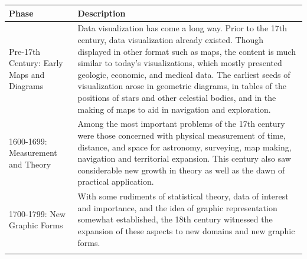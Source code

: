 \documentclass[]{book}
\theoremstyle{definition}
\theoremstyle{definition}
\theoremstyle{definition}
\theoremstyle{remark}
\begin{document}
\begin{longtable}[]{@{}ll@{}}
\toprule
\begin{minipage}[b]{0.16\columnwidth}\raggedright\strut
\textbf{Phase}\strut
\end{minipage} & \begin{minipage}[b]{0.78\columnwidth}\raggedright\strut
\textbf{Description}\strut
\end{minipage}\tabularnewline
\midrule
\endhead
\begin{minipage}[t]{0.16\columnwidth}\raggedright\strut
Pre-17th Century: Early Maps and Diagrams\strut
\end{minipage} & \begin{minipage}[t]{0.78\columnwidth}\raggedright\strut
Data visualization has come a long way. Prior to the 17th century, data
visualization already existed. Though displayed in other format such as
maps, the content is much similar to today's visualizations, which
mostly presented geologic, economic, and medical data. The earliest
seeds of visualization arose in geometric diagrams, in tables of the
positions of stars and other celestial bodies, and in the making of maps
to aid in navigation and exploration.\strut
\end{minipage}\tabularnewline
\begin{minipage}[t]{0.16\columnwidth}\raggedright\strut
1600-1699: Measurement and Theory\strut
\end{minipage} & \begin{minipage}[t]{0.78\columnwidth}\raggedright\strut
Among the most important problems of the 17th century were those
concerned with physical measurement of time, distance, and space for
astronomy, surveying, map making, navigation and territorial expansion.
This century also saw considerable new growth in theory as well as the
dawn of practical application.\strut
\end{minipage}\tabularnewline
\begin{minipage}[t]{0.16\columnwidth}\raggedright\strut
1700-1799: New Graphic Forms\strut
\end{minipage} & \begin{minipage}[t]{0.78\columnwidth}\raggedright\strut
With some rudiments of statistical theory, data of interest and
importance, and the idea of graphic representation somewhat established,
the 18th century witnessed the expansion of these aspects to new domains
and new graphic forms.\strut
\end{minipage}\tabularnewline
\begin{minipage}[t]{0.16\columnwidth}\raggedright\strut

\end{minipage}
\end{longtable}
\end{document}
